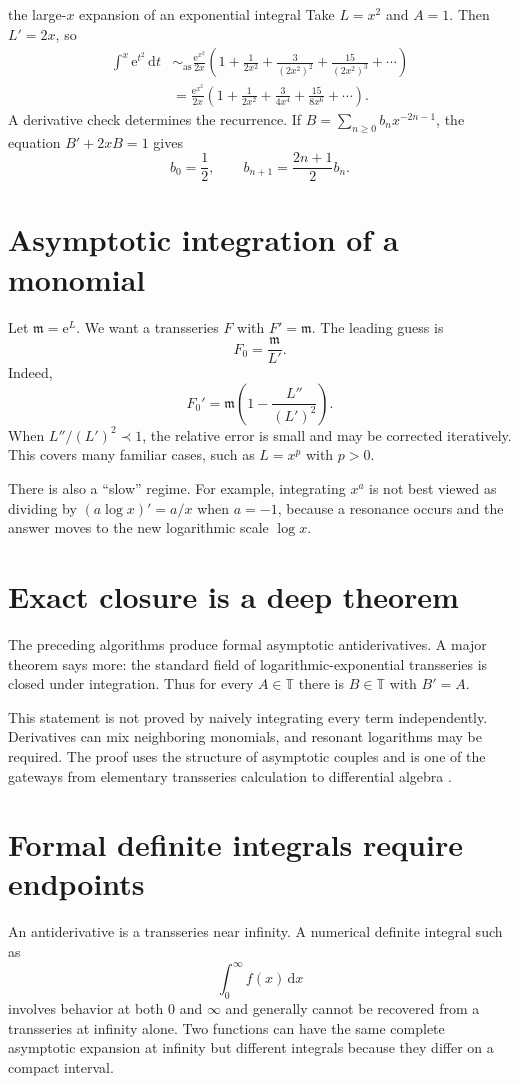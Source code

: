 \documentclass[11pt,openany]{book}
\theoremstyle{plain}
\theoremstyle{definition}
\theoremstyle{remark}
\newcommand{\Tfield}{\mathbb{T}}
\newcommand{\m}{\mathfrak{m}}
\newcommand{\dd}{\,\mathrm{d}}
\newcommand{\e}{\mathrm{e}}
\newcommand{\asympseries}{\sim_{\mathrm{as}}}
\begin{document}
\begin{workedbox}{the large-$x$ expansion of an exponential integral}
Take $L=x^2$ and $A=1$. Then $L'=2x$, so
\begin{align*}
 \int^x \e^{t^2}\dd t
 &\asympseries \frac{\e^{x^2}}{2x}
 \left(1+\frac{1}{2x^2}
 +\frac{3}{(2x^2)^2}
 +\frac{15}{(2x^2)^3}+\cdots\right)\\
 &=\frac{\e^{x^2}}{2x}
 \left(1+\frac{1}{2x^2}
 +\frac{3}{4x^4}
 +\frac{15}{8x^6}+\cdots\right).
\end{align*}
A derivative check determines the recurrence. If
$B=\sum_{n\ge0}b_nx^{-2n-1}$, the equation $B'+2xB=1$ gives
\[
  b_0=\frac12,
  \qquad b_{n+1}=\frac{2n+1}{2}b_n.
\]
\end{workedbox}

\section{Asymptotic integration of a monomial}
Let $\m=\e^L$. We want a transseries $F$ with $F'=\m$. The leading guess is
\[
  F_0=\frac{\m}{L'}.
\]
Indeed,
\[
  F_0'=\m\left(1-\frac{L''}{(L')^2}\right).
\]
When $L''/(L')^2\prec1$, the relative error is small and may be corrected iteratively. This covers many familiar cases, such as $L=x^p$ with $p>0$.

There is also a ``slow'' regime. For example, integrating $x^a$ is not best viewed as dividing by $(a\log x)'=a/x$ when $a=-1$, because a resonance occurs and the answer moves to the new logarithmic scale $\log x$.

\section{Exact closure is a deep theorem}
The preceding algorithms produce formal asymptotic antiderivatives. A major theorem says more: the standard field of logarithmic-exponential transseries is closed under integration. Thus for every $A\in\Tfield$ there is $B\in\Tfield$ with $B'=A$.

This statement is not proved by naively integrating every term independently. Derivatives can mix neighboring monomials, and resonant logarithms may be required. The proof uses the structure of asymptotic couples and is one of the gateways from elementary transseries calculation to differential algebra \cite{Hoeven2006,ADH2017}.

\section{Formal definite integrals require endpoints}
An antiderivative is a transseries near infinity. A numerical definite integral such as
\[
  \int_0^\infty f(x)\dd x
\]
involves behavior at both $0$ and $\infty$ and generally cannot be recovered from a transseries at infinity alone. Two functions can have the same complete asymptotic expansion at infinity but different integrals because they differ on a compact interval.
\end{document}
